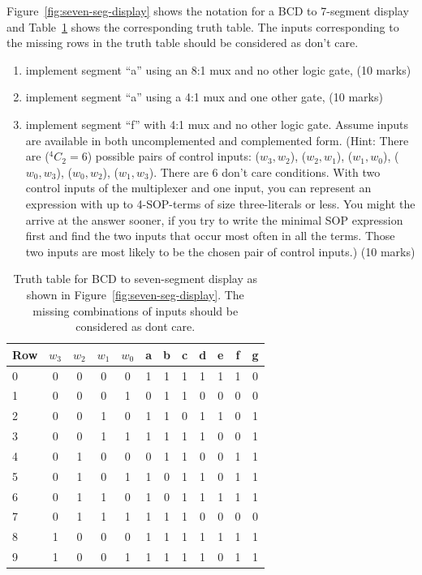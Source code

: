 \begin{prob}
  Figure~\ref{fig:seven-seg-display} shows the notation for a BCD to 7-segment
display and Table~\ref{tab:seven-segment-tt} shows the corresponding truth
table. The inputs corresponding to the missing rows in the truth table should be
considered as don't care.
  \begin{enumerate}
   \item implement segment ``a'' using an 8:1 mux and no other logic gate, (10 marks)
   \item implement segment ``a'' using a 4:1 mux and one other gate, (10 marks)
   \item implement segment ``f'' with 4:1 mux and no other logic gate. Assume
     inputs are available in both uncomplemented and complemented form. (Hint:
     There are (${}^4C_2 = 6$) possible pairs of control inputs: ($w_3, w_2$), ($w_2, w_1$),
     ($w_1,w_0$), ($w_0, w_3$), ($w_0, w_2$), ($w_1, w_3$). There are 6 don't
     care conditions. With two control inputs of the multiplexer and one input,
     you can represent an expression with up to 4-SOP-terms of size
     three-literals or less. You might the arrive at the answer sooner, if you
     try to write the minimal SOP expression first and find the two inputs that
     occur most often in all the terms. Those two inputs are most likely to be the
     chosen pair of control inputs.) (10 marks)
  \end{enumerate}
\end{prob}

\begin{table}[h!]
  \footnotesize
\begin{tabular}{l|cccc||ccccccc}
  \toprule
  Row & $w_3$ & $w_2$ & $w_1$ & $w_0$ & a & b & c & d & e & f & g \\
  \midrule
  0  & 0    & 0   &   0 &   0 & 1 & 1 & 1 & 1 & 1 & 1 & 0 \\
  1  & 0    & 0   &   0 &   1 & 0 & 1 & 1 & 0 & 0 & 0 & 0 \\
  2  & 0    & 0   &   1 &   0 & 1 & 1 & 0 & 1 & 1 & 0 & 1 \\ 
  3  & 0    & 0   &   1 &   1 & 1 & 1 & 1 & 1 & 0 & 0 & 1 \\ 
  4  & 0    & 1   &   0 &   0 & 0 & 1 & 1 & 0 & 0 & 1 & 1 \\ 
  5  & 0    & 1   &   0 &   1 & 1 & 0 & 1 & 1 & 0 & 1 & 1 \\   
  6  & 0    & 1   &   1 &   0 & 1 & 0 & 1 & 1 & 1 & 1 & 1 \\ 
  7  & 0    & 1   &   1 &   1 & 1 & 1 & 1 & 0 & 0 & 0 & 0 \\ 
  8  & 1    & 0   &   0 &   0 & 1 & 1 & 1 & 1 & 1 & 1 & 1 \\
  9  & 1    & 0   &   0 &   1 & 1 & 1 & 1 & 1 & 0 & 1 & 1 \\
  \bottomrule
\end{tabular}
\caption{Truth table for BCD to seven-segment display as shown in
  Figure~\ref{fig:seven-seg-display}. The missing combinations of inputs should
  be considered as dont care.}
\label{tab:seven-segment-tt}
\end{table}

